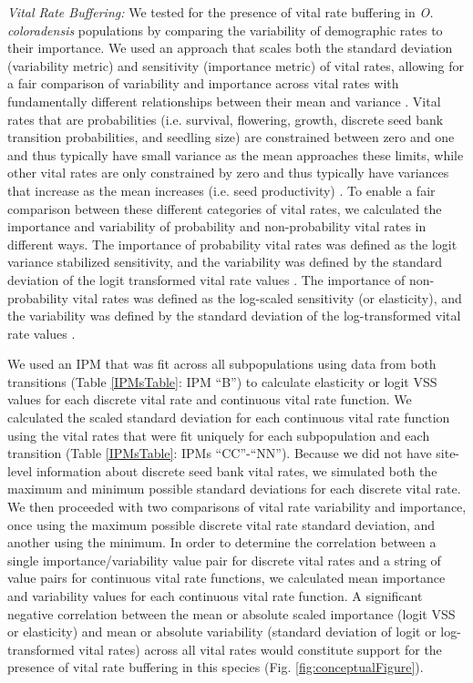 \documentclass[12pt, letterpaper]{article}
\begin{document}
\textit{Vital Rate Buffering:} We tested for the presence of vital rate buffering in \textit{O. coloradensis} populations by comparing the variability of demographic rates to their importance. We used an approach that scales both the standard deviation (variability metric) and sensitivity (importance metric) of vital rates, allowing for a fair comparison of variability and importance across vital rates with fundamentally different relationships between their mean and variance \cite{McDonald2017DivergentEnvironments}. Vital rates that are probabilities (i.e. survival, flowering, growth, discrete seed bank transition probabilities, and seedling size) are constrained between zero and one and thus typically have small variance as the mean approaches these limits, while other vital rates are only constrained by zero and thus typically have variances that increase as the mean increases (i.e. seed productivity) \cite{Gaillard2003-ch}. To enable a fair comparison between these different categories of vital rates, we calculated the importance and variability of probability and non-probability vital rates in different ways. The importance of probability vital rates was defined as the logit variance stabilized sensitivity, and the variability was defined by the standard deviation of the logit transformed vital rate values \cite{McDonald2017DivergentEnvironments, William_A_Link_Paul_F_Doherty_Fr2002-cb}. The importance of non-probability vital rates was defined as the log-scaled sensitivity (or elasticity), and the variability was defined by the standard deviation of the log-transformed vital rate values \cite{McDonald2017DivergentEnvironments, Morris2002QuantitativeAnalysis}.

We used an IPM that was fit across all subpopulations using data from both transitions (Table \ref{IPMsTable}: IPM “B”) to calculate elasticity or logit VSS values for each discrete vital rate and continuous vital rate function. 
We calculated the scaled standard deviation for each continuous vital rate function using the vital rates that were fit uniquely for each subpopulation and each transition (Table \ref{IPMsTable}: IPMs “CC”-“NN”). Because we did not have site-level information about discrete seed bank vital rates, we simulated both the maximum and minimum possible standard deviations for each discrete vital rate. We then proceeded with two comparisons of vital rate variability and importance, once using the maximum possible discrete vital rate standard deviation, and another using the minimum. In order to determine the correlation between a single importance/variability value pair for discrete vital rates and a string of value pairs for continuous vital rate functions, we calculated mean importance and variability values for each continuous vital rate function. A significant negative correlation between the mean or absolute scaled importance (logit VSS or elasticity) and mean or absolute variability (standard deviation of logit or log-transformed vital rates) across all vital rates would constitute support for the presence of vital rate buffering in this species
(Fig. \ref{fig:conceptualFigure}).  
\end{document}
